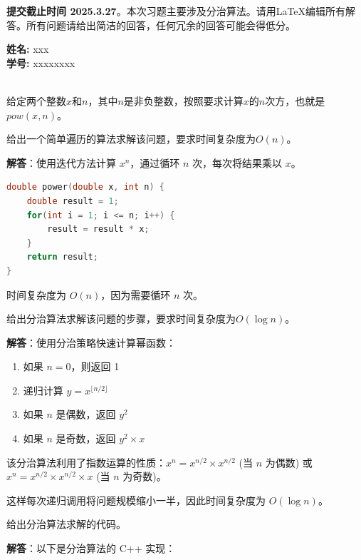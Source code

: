 \documentclass[12pt,twoside]{article}
\newcommand{\theproblemsetnum}{2}
\newcommand{\releasedate}{2025.3.20}
\newcommand{\partaduedate}{ 2025.3.27}
\begin{document}
\handout{实验 \theproblemsetnum}{\releasedate}
\textbf{提交截止时间 {\bf \partaduedate}}。本次习题主要涉及分治算法。请用\LaTeX 编辑所有解答。所有问题请给出简洁的回答，任何冗余的回答可能会得低分。

\setlength{\parindent}{0pt}
\medskip\hrulefill\medskip

{\bf 姓名:} xxx\\
{\bf 学号:} xxxxxxxx\\


\medskip

\medskip\hrulefill

\begin{problems}

\\
给定两个整数$x$和$n$，其中$n$是非负整数，按照要求计算$x$的$n$次方，也就是$pow(x,n)$。

\bparts
\ppart 给出一个简单遍历的算法求解该问题，要求时间复杂度为$O(n)$。

\textbf{解答}：使用迭代方法计算 $x^n$，通过循环 $n$ 次，每次将结果乘以 $x$。

\begin{lstlisting}[language=C++]
double power(double x, int n) {
    double result = 1;
    for(int i = 1; i <= n; i++) {
        result = result * x;
    }
    return result;
}
\end{lstlisting}

时间复杂度为 $O(n)$，因为需要循环 $n$ 次。

\ppart 给出分治算法求解该问题的步骤，要求时间复杂度为$O(\log n)$。

\textbf{解答}：使用分治策略快速计算幂函数：

\begin{enumerate}
\item 如果 $n = 0$，则返回 1
\item 递归计算 $y = x^{\lfloor n/2 \rfloor}$
\item 如果 $n$ 是偶数，返回 $y^2$
\item 如果 $n$ 是奇数，返回 $y^2 \times x$
\end{enumerate}

该分治算法利用了指数运算的性质：$x^n = x^{n/2} \times x^{n/2}$ (当 $n$ 为偶数) 
或 $x^n = x^{n/2} \times x^{n/2} \times x$ (当 $n$ 为奇数)。

这样每次递归调用将问题规模缩小一半，因此时间复杂度为 $O(\log n)$。

\ppart 给出分治算法求解的代码。

\textbf{解答}：以下是分治算法的 C++ 实现：


\end{problems}
\end{document}
